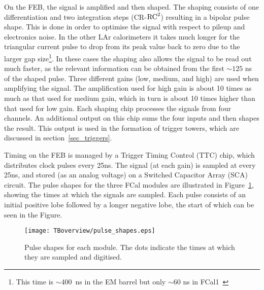 On the FEB, the signal is amplified and then shaped. The shaping consists of one differentiation and two integration steps (CR-${\rm RC}^2$) resulting in a bipolar pulse shape. This is done in order to optimise the signal with respect to pileup and electronics noise\cite{TDR_LAR,ATLAS_FEB_design}. In the other LAr calorimeters it takes much longer for the triangular current pulse to drop from its peak value back to zero due to the larger gap size\footnote{This time is $\sim$400~ns in the EM barrel but only $\sim 60$ ns in FCal1~\cite{FCal_jinst_2010}}. In these cases the shaping also allows the signal to be read out much faster, as the relevant information can be obtained from the first $\sim 125$ ns of the shaped pulse. 
Three different gains (low, medium, and high) are used when amplifying the signal. The amplification used for high gain is about 10 times as much as that used for medium gain, which in turn is about 10 times higher than that used for low gain. Each shaping chip processes the signals from four channels. An additional output on this chip sums the four inputs and then shapes the result. This output is used in the formation of trigger towers, which are discussed in section~\ref{sec_triggers}.

Timing on the FEB is managed by a Trigger Timing Control (TTC) chip, which distributes clock pulses every  25ns. The signal (at each gain) is sampled at every 25ns, and stored (as an analog voltage) on a Switched Capacitor Array (SCA) circuit. The pulse shapes for the three FCal modules are illustrated in Figure~\ref{fig_pulsehape}, showing the times at which the signals are sampled. Each pulse consists of an initial positive lobe followed by a longer negative lobe, the start of which can be seen in the Figure. 

\begin{figure}[tb]
\begin{center}
\texttt{[image: TBoverview/pulse\_shapes.eps]}
\end{center}
\caption[Pulse shapes for the FCal modules.]{Pulse shapes for each module. The dots indicate the times at which they are sampled and digitised.}
\label{fig_pulsehape}
\end{figure}

